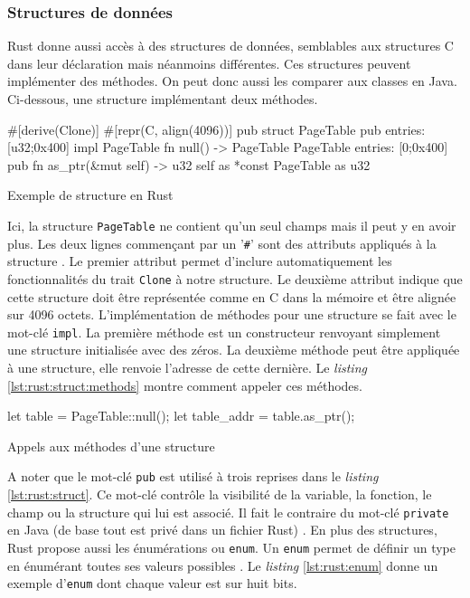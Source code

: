 
\subsubsection{Structures de données}
Rust donne aussi accès à des structures de données, semblables aux structures
C dans leur déclaration mais néanmoins différentes. Ces structures peuvent
implémenter des méthodes. On peut donc aussi les comparer aux classes en Java.
Ci-dessous, une structure implémentant deux méthodes.

\begin{code}
\begin{rustcode}
#[derive(Clone)]
#[repr(C, align(4096))]
pub struct PageTable {
    pub entries: [u32;0x400]
}
impl PageTable {
    fn null() -> PageTable {
        PageTable {
            entries: [0;0x400]
        }
    }
    pub fn as_ptr(&mut self) -> u32 {
        self as *const PageTable as u32
    }
}
\end{rustcode}
\caption{Exemple de structure en Rust}
\label{lst:rust:struct}
\end{code} \bigbreak

Ici, la structure \texttt{PageTable} ne contient qu'un seul champs
mais il peut y en avoir plus. Les deux lignes commençant par un '\texttt{#}'
sont des attributs appliqués à la structure \cite{ref2}. Le premier attribut permet
d'inclure automatiquement les fonctionnalités du trait \texttt{Clone}
à notre structure. Le deuxième attribut indique que cette structure doit être représentée
comme en C dans la mémoire et être alignée sur 4096 octets. L'implémentation de
méthodes pour une structure se fait avec le mot-clé \texttt{impl}. La
première méthode est un constructeur renvoyant simplement une structure initialisée
avec des zéros. La deuxième méthode peut être appliquée à une structure, elle
renvoie l'adresse de cette dernière. Le \textit{listing} \ref{lst:rust:struct:methods}
montre comment appeler ces méthodes.

\begin{code}
\begin{rustcode}
let table = PageTable::null();
let table_addr = table.as_ptr();
\end{rustcode}
\caption{Appels aux méthodes d'une structure}
\label{lst:rust:struct:methods}
\end{code} \bigbreak

A noter que le mot-clé \texttt{pub} est utilisé à trois reprises dans
le \textit{listing} \ref{lst:rust:struct}. Ce mot-clé contrôle la visibilité de
la variable, la fonction, le champ ou la structure qui lui est associé. Il fait
le contraire du mot-clé \texttt{private} en Java (de base tout est privé
dans un fichier Rust) \cite{ref2}. En plus des structures, Rust propose aussi
les énumérations ou \texttt{enum}. Un \texttt{enum} permet
de définir un type en énumérant toutes ses valeurs possibles \cite{ref2}. Le
\textit{listing} \ref{lst:rust:enum} donne un exemple d'\texttt{enum}
dont chaque valeur est sur huit bits.


